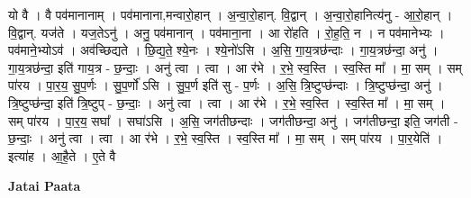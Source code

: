 \documentclass[17pt]{extarticle}
\begin{document}
यो वै । वै पव॑मानानाम् । पव॑मानाना,मन्वारो॒हान् । अ॒न्वा॒रो॒हान्. वि॒द्वान् । अ॒न्वा॒रो॒हानित्य॑नु - आ॒रो॒हान् । वि॒द्वान्. यज॑ते । यज॒तेऽनु॑ । अनु॒ पव॑मानान् । पव॑माना॒ना । आ रो॑हति । रो॒ह॒ति॒ न । न पव॑मानेभ्यः । पव॑माने॒भ्योऽव॑ । अव॑च्छिद्यते । छि॒द्य॒ते॒ श्ये॒नः । श्ये॒नो॑ऽसि । अ॒सि॒ गा॒य॒त्रछ॑न्दाः । गा॒य॒त्रछ॑न्दा॒ अनु॑ । गा॒य॒त्रछ॑न्दा॒ इति॑ गाय॒त्र - छ॒न्दाः॒ । अनु॑ त्वा । त्वा । आ र॑भे । र॒भे॒ स्व॒स्ति । स्व॒स्ति मा᳚ । मा॒ सम् । सम् पा॑रय । पा॒र॒य॒ सु॒प॒र्णः । सु॒प॒र्णो॑ ऽसि । सु॒प॒र्ण इति॑ सु - प॒र्णः । अ॒सि॒ त्रि॒ष्टुप्छ॑न्दाः । त्रि॒ष्टुप्छ॑न्दा॒ अनु॑ । त्रि॒ष्टुप्छ॑न्दा॒ इति॑ त्रि॒ष्टुप् - छ॒न्दाः॒ । अनु॑ त्वा । त्वा । आ र॑भे । र॒भे॒ स्व॒स्ति । स्व॒स्ति मा᳚ । 
मा॒ सम् । सम् पा॑रय । पा॒र॒य॒ सघा᳚ । सघा॑ऽसि । अ॒सि॒ जग॑तीछन्दाः । जग॑तीछन्दा॒ अनु॑ । जग॑तीछन्दा॒ इति॒ जग॑ती - छ॒न्दाः॒ । अनु॑ त्वा । त्वा । 
आ र॑भे । र॒भे॒ स्व॒स्ति । स्व॒स्ति मा᳚ । मा॒ सम् । सम् पा॑रय । 
पा॒र॒येति॑ । इत्या॑ह । आ॒है॒ते । ए॒ते वै \newline

\textbf{Jatai Paata} \newline
\end{document}
